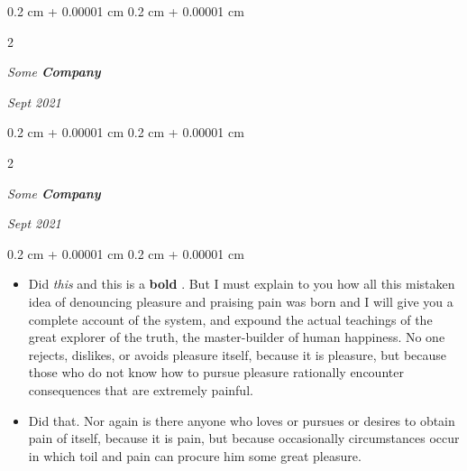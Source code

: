 \documentclass[10pt, letterpaper]{article}
\newenvironment{highlights}{
    \begin{itemize}[
        topsep=0.10 cm,
        parsep=0.10 cm,
        partopsep=0pt,
        itemsep=0pt,
        leftmargin=0.4 cm + 10pt
    ]
}{
    \end{itemize}
} %
\newenvironment{onecolentry}{
    \begin{adjustwidth}{
        0.2 cm + 0.00001 cm
    }{
        0.2 cm + 0.00001 cm
    }
}{
    \end{adjustwidth}
} %
\newenvironment{twocolentry}[2][]{
    \onecolentry
    \def\secondColumn{#2}
    \setcolumnwidth{\fill, 4.5 cm}
    \begin{paracol}{2}
}{
    \switchcolumn \raggedleft \secondColumn
    \end{paracol}
    \endonecolentry
} %
\let\hrefWithoutArrow\href
\renewcommand{\href}[2]{\hrefWithoutArrow{#1}{\ifthenelse{\equal{#2}{}}{ }{#2 }\raisebox{.15ex}{\footnotesize \faExternalLink*}}}
\begin{document}
        \vspace{0.2 cm}

            \begin{twocolentry}{


        \textit{Sept 2021}    }
                \textbf{}

                \textit{Some \textbf{Company}}
            \end{twocolentry}



        \vspace{0.2 cm}

            \begin{twocolentry}{


        \textit{Sept 2021}    }
                \textbf{}

                \textit{Some \textbf{Company}}
            \end{twocolentry}

        \vspace{0.10 cm}
        \begin{onecolentry}
            \begin{highlights}
                \item Did \textit{this} and this is a \textbf{bold} \href{https://example.com}{link}. But I must explain to you how all this mistaken idea of denouncing pleasure and praising pain was born and I will give you a complete account of the system, and expound the actual teachings of the great explorer of the truth, the master-builder of human happiness. No one rejects, dislikes, or avoids pleasure itself, because it is pleasure, but because those who do not know how to pursue pleasure rationally encounter consequences that are extremely painful.
                \item Did that. Nor again is there anyone who loves or pursues or desires to obtain pain of itself, because it is pain, but because occasionally circumstances occur in which toil and pain can procure him some great pleasure.
            \end{highlights}
        \end{onecolentry}
\end{document}
